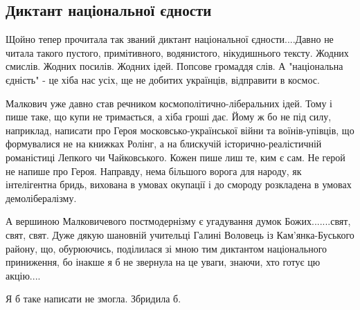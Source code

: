  
 
 

\subsection{Диктант національної єдности}
\label{sec:11_11_2020.fb.iryna_farion.1.mova_kosmos}

Щойно тепер прочитала так званий диктант національної єдности....Давно не
читала такого пустого, примітивного, водянистого, нікудишнього тексту. Жодних
смислів. Жодних посилів. Жодних ідей. Попсове громаддя слів. А "національна
єдність" - це хіба нас усіх, ще не добитих українців, відправити в космос.

Малкович уже давно став речником космополітично-ліберальних ідей. Тому і пише
таке, що купи не тримається, а хіба гроші дає. Йому ж бо не під силу,
наприклад, написати про Героя московсько-української війни та воїнів-упівців,
що формувалися не на книжках Ролінг, а на блискучій історично-реалістичній
романістиці Лепкого чи Чайковського. Кожен пише лиш те, ким є сам. Не герой не
напише про Героя. Направду, нема більшого ворога для народу, як інтелігентна
бридь, вихована в умовах окупації і до смороду розкладена в умовах
демолібералізму. 

А вершиною  Малковичевого постмодернізму є угадування думок Божих.......свят,
свят, свят.  Дуже дякую шановній учительці Галині Воловець із Кам'янка-Буського
району, що, обурюючись, поділилася зі мною тим диктантом національного
приниження, бо інакше я б не звернула на це уваги, знаючи, хто готує цю
акцію.... 

Я б таке написати не змогла. Збридила б.
